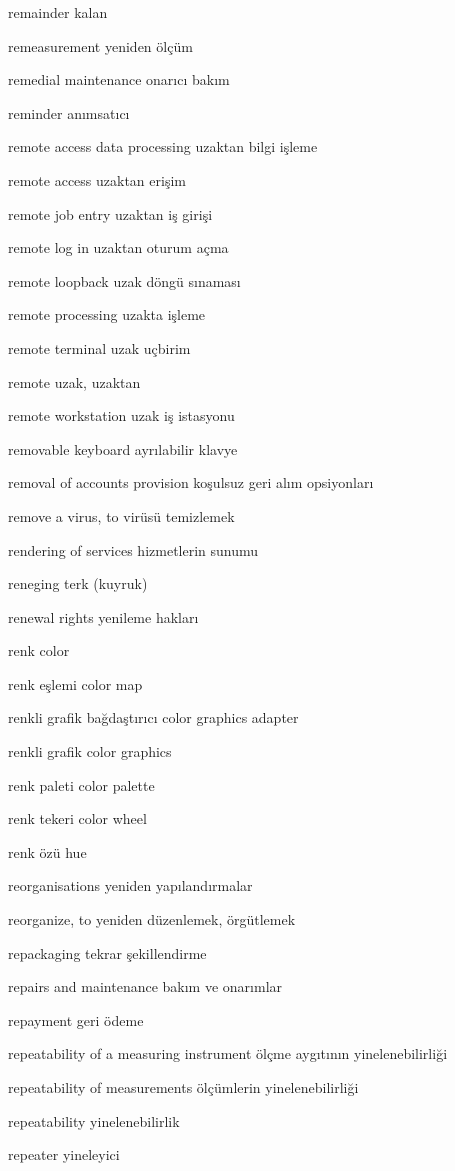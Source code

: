 \documentclass[12pt,fleqn]{article}\usepackage{../../common}
\begin{document}
remainder kalan

remeasurement yeniden ölçüm

remedial maintenance onarıcı bakım

reminder anımsatıcı

remote access data processing uzaktan bilgi işleme

remote access uzaktan erişim

remote job entry uzaktan iş girişi

remote log in uzaktan oturum açma

remote loopback uzak döngü sınaması

remote processing uzakta işleme

remote terminal uzak uçbirim

remote uzak, uzaktan

remote workstation uzak iş istasyonu

removable keyboard ayrılabilir klavye

removal of accounts provision koşulsuz geri alım opsiyonları

remove a virus, to virüsü temizlemek

rendering of services hizmetlerin sunumu

reneging terk (kuyruk)

renewal rights yenileme hakları

renk color

renk eşlemi color map

renkli grafik bağdaştırıcı color graphics adapter

renkli grafik color graphics

renk paleti color palette

renk tekeri color wheel

renk özü hue

reorganisations yeniden yapılandırmalar

reorganize, to yeniden düzenlemek, örgütlemek

repackaging tekrar şekillendirme

repairs and maintenance bakım ve onarımlar

repayment geri ödeme

repeatability of a measuring instrument ölçme aygıtının yinelenebilirliği

repeatability of measurements ölçümlerin yinelenebilirliği

repeatability yinelenebilirlik

repeater yineleyici
\end{document}
